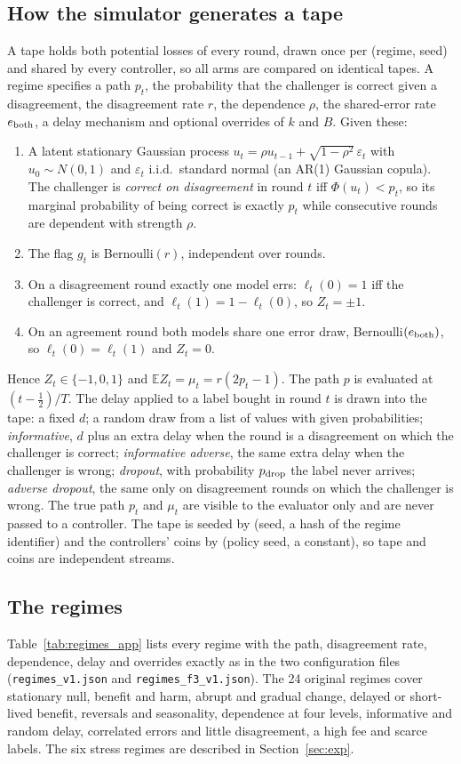 \documentclass[10pt]{article}
\theoremstyle{plain}
\theoremstyle{definition}
\newcommand{\E}{\mathbb{E}}
\begin{document}
\subsection{How the simulator generates a tape}
A tape holds both potential losses of every round, drawn once per (regime, seed) and shared by every controller, so all arms are compared on identical tapes. A regime specifies a path $p_t$, the probability that the challenger is correct given a disagreement, the disagreement rate $r$, the dependence $\rho$, the shared-error rate $e_{\rm both}$, a delay mechanism and optional overrides of $k$ and $B$. Given these:
\begin{enumerate}
\item A latent stationary Gaussian process $u_t=\rho u_{t-1}+\sqrt{1-\rho^2}\,\varepsilon_t$ with $u_0\sim N(0,1)$ and $\varepsilon_t$ i.i.d.\ standard normal (an AR(1) Gaussian copula). The challenger is \emph{correct on disagreement} in round $t$ iff $\Phi(u_t)<p_t$, so its marginal probability of being correct is exactly $p_t$ while consecutive rounds are dependent with strength $\rho$.
\item The flag $g_t$ is Bernoulli$(r)$, independent over rounds.
\item On a disagreement round exactly one model errs: $\ell_t(0)=1$ iff the challenger is correct, and $\ell_t(1)=1-\ell_t(0)$, so $Z_t=\pm1$.
\item On an agreement round both models share one error draw, Bernoulli$(e_{\rm both})$, so $\ell_t(0)=\ell_t(1)$ and $Z_t=0$.
\end{enumerate}
Hence $Z_t\in\{-1,0,1\}$ and $\E Z_t=\mu_t=r(2p_t-1)$. The path $p$ is evaluated at $(t-\tfrac12)/T$. The delay applied to a label bought in round $t$ is drawn into the tape: a fixed $d$; a random draw from a list of values with given probabilities; \emph{informative}, $d$ plus an extra delay when the round is a disagreement on which the challenger is correct; \emph{informative adverse}, the same extra delay when the challenger is wrong; \emph{dropout}, with probability $p_{\rm drop}$ the label never arrives; \emph{adverse dropout}, the same only on disagreement rounds on which the challenger is wrong. The true path $p_t$ and $\mu_t$ are visible to the evaluator only and are never passed to a controller. The tape is seeded by (seed, a hash of the regime identifier) and the controllers' coins by (policy seed, a constant), so tape and coins are independent streams.

\subsection{The \NRegimes{} regimes}
Table~\ref{tab:regimes_app} lists every regime with the path, disagreement rate, dependence, delay and overrides exactly as in the two configuration files (\texttt{regimes\_v1.json} and \texttt{regimes\_f3\_v1.json}). The 24 original regimes cover stationary null, benefit and harm, abrupt and gradual change, delayed or short-lived benefit, reversals and seasonality, dependence at four levels, informative and random delay, correlated errors and little disagreement, a high fee and scarce labels. The six stress regimes are described in Section~\ref{sec:exp}.
\end{document}
